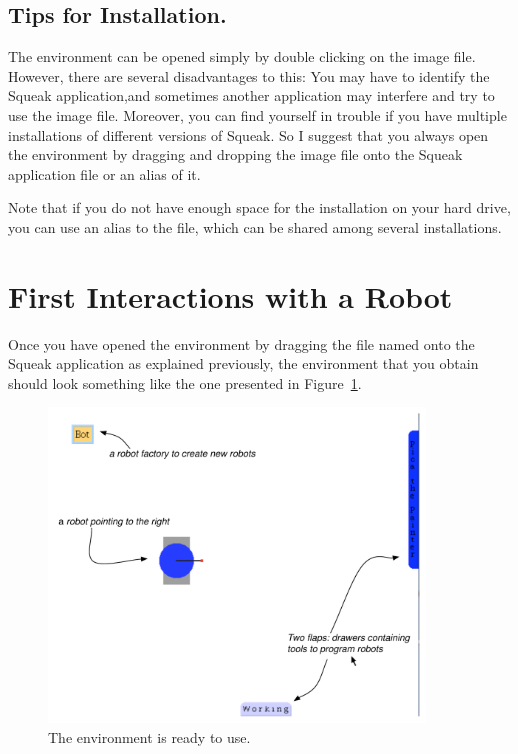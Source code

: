 \documentclass[a4paper,10pt,twoside]{book}
\begin{document}
\subsection{Tips for Installation.}
The environment can be opened simply by double clicking on the image file. However, there 
are several disadvantages to this: You may have to identify the Squeak application,and sometimes another 
application may interfere and try to use the image file. Moreover, you can find 
yourself in trouble if you have multiple installations of different versions of Squeak. So I suggest that you 
always open the environment by dragging and dropping the image file onto the 
Squeak application file or an alias of it. 

Note that if you do not have enough space for the installation on your hard drive, you can 
use an alias to the  file, which can be shared among several installations. 





\section{First Interactions with a Robot}

Once you have opened the environment by dragging the file named  onto the 
Squeak application as explained previously, the environment that you obtain should look 
something like the one presented in Figure~\ref{fig:firstEnvironment}. 

\begin{figure}[!h]\centerline{\includegraphics[width=10cm]{7-firstEnvironmentAnnotated}} 
\caption{The environment is ready to use.\label{fig:firstEnvironment}}
\end{figure}
\end{document}
